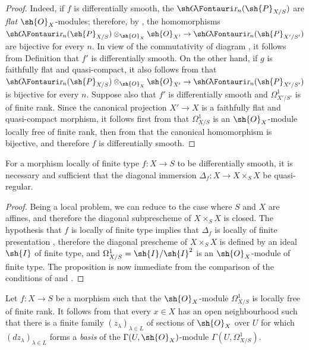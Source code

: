 \begin{proof}
Indeed, if $f$ is differentially smooth, the $\shGr_n(\sh{P}_{X/S})$ are \emph{flat} $\sh{O}_X$-modules;
therefore, by , the homomorphisms $\shGr_n(\sh{P}_{X/S}) \otimes_{\sh{O}_X} \sh{O}_{X'} \to \shGr_n(\sh{P}_{X'/S'})$ are bijective for every $n$. In view of the commutativity of diagram , it follows from Definition  that $f'$ is differentially smooth.
On the other hand, if $g$ is faithfully flat and quasi-compact, it also follows from  that $\shGr_n(\sh{P}_{X/S}) \otimes_{\sh{O}_X} \sh{O}_{X'} \to \shGr_n(\sh{P}_{X'/S'})$ is bijective for every $n$.
Suppose also that $f'$ is differentially smooth and $\Omega_{X'/S'}^1$ is of finite rank.
Since the canonical projection $X' \to X$ is a faithfully flat and quasi-compact morphism, it follows first from  that $\Omega_{X/S}^1$ is an $\sh{O}_X$-module locally free of finite rank, then from  that the canonical homomorphism  is bijective, and therefore $f$ is differentially smooth.
\end{proof}

\begin{proposition}[16.10.5]
\label{IV.16.10.5}
For a morphism locally of finite type $f:X \to S$ to be differentially smooth, it is necessary and sufficient that the diagonal immersion $\Delta_f:X \to X \times_S X$ be quasi-regular.
\end{proposition}
  

\begin{proof}
Being a local problem, we can reduce to the case where $S$ and $X$ are affines, and therefore the diagonal subprescheme of $X \times_S X$ is closed.
The hypothesis that $f$ is locally of finite type implies that $\Delta_f$ is locally of finite presentation , therefore the diagonal prescheme of $X \times_S X$ is defined by an ideal $\sh{I}$ of finite type, and $\Omega_{X/S}^1 = \sh{I}/\sh{I}^2$ is an $\sh{O}_X$-module of finite type.
The proposition is now immediate from the comparison of the conditions of  and . 
\end{proof}

\begin{remark}[16.10.6]
\label{IV.16.10.6}
Let $f:X \to S$ be a morphism such that the $\sh{O}_X$-module $\Omega_{X/S}^1$ is locally free of finite rank.
It follows from  that every $x \in X$ has an open neighbourhood such that there is a finite family $(z_\lambda)_{\lambda \in L}$ of sections of $\sh{O}_X$ over $U$ for which $(dz_\lambda)_{\lambda \in L}$ forms a \emph{basis} of the $\Gamma(U, \sh{O}_X)$-module $\Gamma(U, \Omega_{X/S}^1)$.
\end{remark}

